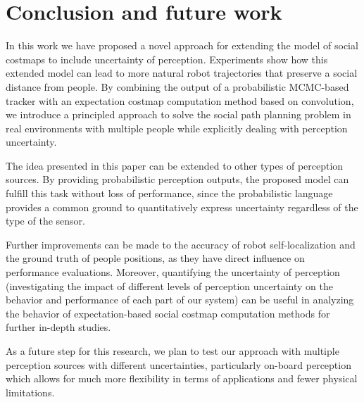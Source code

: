 \section{Conclusion and future work}
\label{sec:conclusion}

In this work we have proposed a novel approach for extending the model of social costmaps to include uncertainty of perception. Experiments show how this extended model can lead to more natural robot trajectories that preserve a social distance from people. By combining the output of a probabilistic MCMC-based tracker with an expectation costmap computation method based on convolution, we introduce a principled approach to solve the social path planning problem in real environments with multiple people while explicitly dealing with perception uncertainty. 



The idea presented in this paper can be extended to other types of perception sources. By providing probabilistic perception outputs, the proposed model can fulfill this task without loss of performance, since the probabilistic language provides a common ground to quantitatively express uncertainty regardless of the type of the sensor. 


Further improvements can be made to the accuracy of robot self-localization and the ground truth of people positions, as they have direct influence on performance evaluations. Moreover, quantifying the uncertainty of perception (investigating the impact of different levels of perception uncertainty on the behavior and performance of each part of our system) can be useful in analyzing the behavior of expectation-based social costmap computation methods for further in-depth studies.


As a future step for this research, we plan to test our approach with multiple perception sources with different uncertainties, particularly on-board perception which allows for much more flexibility in terms of applications and fewer physical limitations.%









